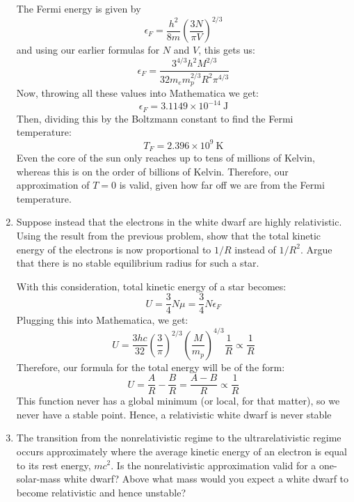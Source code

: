 \documentclass[10pt]{article}
\begin{document}
\begin{enumerate}[label=\alph*)]
			\begin{solution}
				The Fermi energy is given by 
				\[
				\epsilon_F = \frac{h^2}{8m}\left( \frac{3N}{\pi V} \right)^{2 /3}
				\] 
				and using our earlier formulas for \( N \) and \( V \), this gets us:
				\[
					\epsilon_F = \frac{3^{4 / 3} h^2M^{2 / 3}}{32 m_e m_p^{2/ 3} R^2 \pi^{4 /3}}
				\] 
				Now, throwing all these values into Mathematica we get:
				\[
				\epsilon_F = 3.1149 \times  10^{-14} \ \text{J}
				\] 
				Then, dividing this by the Boltzmann constant to find the Fermi temperature:
				\[
				T_F = 2.396 \times 10^{9} \ \text{K}
				\] 
				Even the core of the sun only reaches up to tens of millions of Kelvin, whereas this 
				is on the order of billions of Kelvin. Therefore, our approximation of \( T =0 \) is 
				valid, given how far off we are from the Fermi temperature. 
			\end{solution}
		\item Suppose instead that the electrons in the white dwarf are highly relativistic. Using the result 
			from the previous problem, show that the total kinetic energy of the electrons is now 
			proportional to \( 1 / R \) instead of \( 1 / R^2 \). Argue that there is no stable 
			equilibrium radius for such a star.

			\begin{solution}
				With this consideration, total kinetic energy of a star becomes:
				\[
				U = \frac{3}{4}N \mu = \frac{3}{4}N\epsilon_F 
				\] 
				Plugging this into Mathematica, we get: 
				\[
				U = \frac{3hc}{32}\left( \frac{3}{\pi} \right) ^{ 2/ 3}\left( \frac{M}{m_p} \right) ^{4 / 3}\frac{1}{R} \propto \frac{1}{R}
				\] 
				Therefore, our formula for the total energy will be of the form: 
				\[
				U = \frac{A}{R} - \frac{B}{R} = \frac{A-B}{R} \propto \frac{1}{R}
				\] 
				This function never has a global minimum (or local, for that matter), 
				so we never have a stable point. Hence, a relativistic white dwarf is never stable
			\end{solution}
		\item The transition from the nonrelativistic regime to the ultrarelativistic regime occurs 
			approximately where the average kinetic energy of an electron is equal to its rest energy, 
			\( mc^2 \). Is the nonrelativistic approximation valid for a one-solar-mass white dwarf? Above
			what mass would you expect a white dwarf to become relativistic and hence unstable?


\end{enumerate}
\end{document}
